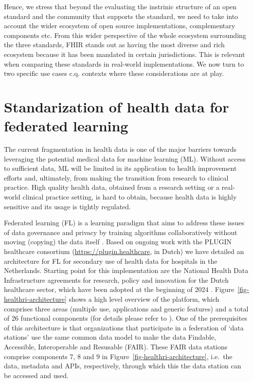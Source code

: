 \documentclass[
  authoryear]{elsarticle}
\begin{document}
Hence, we stress that beyond the evaluating the instrinic structure of
an open standard and the community that supports the standard, we need
to take into account the wider ecosystem of open source implementations,
complementary components etc. From this wider perspective of the whole
ecosystem surrounding the three standards, FHIR stands out as having the
most diverse and rich ecosystem because it has been mandated in certain
jurisdictions. This is relevant when comparing these standards in
real-world implementations. We now turn to two specific use cases c.q.
contexts where these considerations are at play.

\section{Standarization of health data for federated
learning}\label{standarization-of-health-data-for-federated-learning}

The current fragmentation in health data is one of the major barriers
towards leveraging the potential medical data for machine learning (ML).
Without access to sufficient data, ML will be limited in its application
to health improvement efforts and, ultimately, from making the
transition from research to clinical practice. High quality health data,
obtained from a research setting or a real-world clinical practice
setting, is hard to obtain, because health data is highly sensitive and
its usage is tightly regulated.

Federated learning (FL) is a learning paradigm that aims to address
these issues of data governance and privacy by training algorithms
collaboratively without moving (copying) the data itself
\citep{rieke2020future, teo2024federated}. Based on ongoing work with
the PLUGIN healthcare consortium (\url{https://plugin.healthcare}, in
Dutch) we have detailed an architecture for FL for secondary use of
health data for hospitals in the Netherlands. Starting point for this
implementation are the National Health Data Infrastructure agreements
for research, policy and innovation for the Dutch healthcare sector,
which have been adopted at the beginning of 2024
\citep{healthri2024agreements}. Figure~\ref{fig-healthri-architecture}
shows a high level overview of the platform, which comprises three areas
(multiple use, applications and generic features) and a total of 26
functional components (for details please refer to
\citep{healthri2024agreements}). One of the prerequisites of this
architecture is that organizations that participate in a federation of
`data stations' use the same common data model to make the data
Findable, Accessible, Interoperable and Resusable (FAIR). These FAIR
data stations comprise components 7, 8 and 9 in
Figure~\ref{fig-healthri-architecture}, i.e.~the data, metadata and
APIs, respectively, through which this the data station can be accessed
and used.
\end{document}
